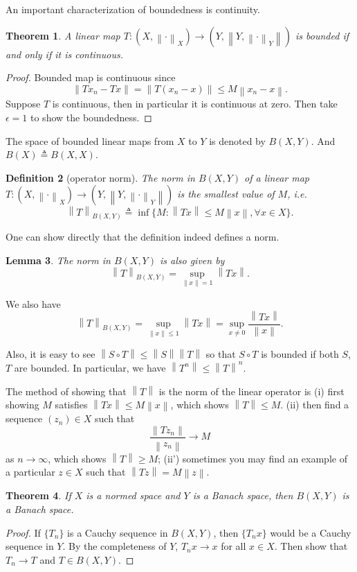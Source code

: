 \documentclass[12pt,a4paper]{report}
\numberwithin{equation}{section}
\theoremstyle{mystyle}
\newtheorem{definition}{Definition}[section]
\newtheorem{theorem}[definition]{Theorem}
\newtheorem{lemma}[definition]{Lemma}
\newcommand{\norm}[1]{\left\lVert #1 \right\rVert}
\begin{document}
	An important characterization of boundedness is continuity.
	\begin{theorem}
		A linear map $T:(X,\norm{\cdot}_X)\to(Y,\norm{Y,\norm{\cdot}_Y})$ is bounded if and only if it is continuous.
	\end{theorem}
	\begin{proof}
		Bounded map is continuous since 
		$$
		\norm{Tx_n-Tx}=\norm{T(x_n-x)}\leq M \norm{x_n-x}.
		$$
		Suppose $T$ is continuous, then in particular it is continuous at zero. Then take $\epsilon=1$ to show the boundedness.
	\end{proof}

	The space of bounded linear maps from $X$ to $Y$ is denoted by $B(X,Y)$. And $B(X)\triangleq B(X,X)$.
	\begin{definition}[operator norm]
		The norm in $B(X,Y)$ of a linear map $T:(X,\norm{\cdot}_X)\to(Y,\norm{Y,\norm{\cdot}_Y})$ is the smallest value of $M$, i.e.
		$$
		\norm{T}_{B(X,Y)}\triangleq \inf\{M:\norm{Tx}\leq M\norm{x},\forall x\in X\}.
		$$
	\end{definition}
	One can show directly that the definition indeed defines a norm.
	
	\begin{lemma}\label{lem:equiv norm}
		The norm in $B(X,Y)$ is also given by
		$$
		\norm{T}_{B(X,Y)} = \sup_{\norm{x}=1}\norm{Tx}.
		$$
	\end{lemma}
	We also have
	\begin{equation}
		\norm{T}_{B(X,Y)}=\sup_{\norm{x}\leq 1}\norm{Tx}=\sup_{x\neq 0}\frac{\norm{Tx}}{\norm{x}}.
	\end{equation}
	
	Also, it is easy to see $\norm{S\circ T}\leq \norm{S}\norm{T}$ so that $S\circ T$ is bounded if both $S$, $T$ are bounded. In particular, we have $\norm{T^n}\leq \norm{T}^n$. 
	
	The method of showing that $\norm{T}$ is the norm of the linear operator is (i) first showing $M$ satisfies
	$\norm{Tx}\leq M\norm{x}$, which shows $\norm{T}\leq M$. (ii) then find a sequence $(z_n)\in X$ such that
	$$
	\frac{\norm{Tz_n}}{\norm{z_n}}\to M
	$$
	as $n\to \infty$, which shows $\norm{T}\geq M$; (ii') sometimes you may find an example of a particular $z\in X$ such that $\norm{T z}=M \norm{z}$.
	
	\begin{theorem}\label{thm:B(X,Y) complete}
		If $X$ is a normed space and $Y$ is a Banach space, then $B(X,Y)$ is a Banach space.
	\end{theorem}
	\begin{proof}
		If $\{T_n\}$ is a Cauchy sequence in $B(X,Y)$, then $\{T_n x\}$ would be a Cauchy sequence in $Y$. By the completeness of $Y$, $T_n x\to x$ for all $x\in X$. Then show that $T_n\to T$ and $T\in B(X,Y)$.
	\end{proof}
\end{document}
